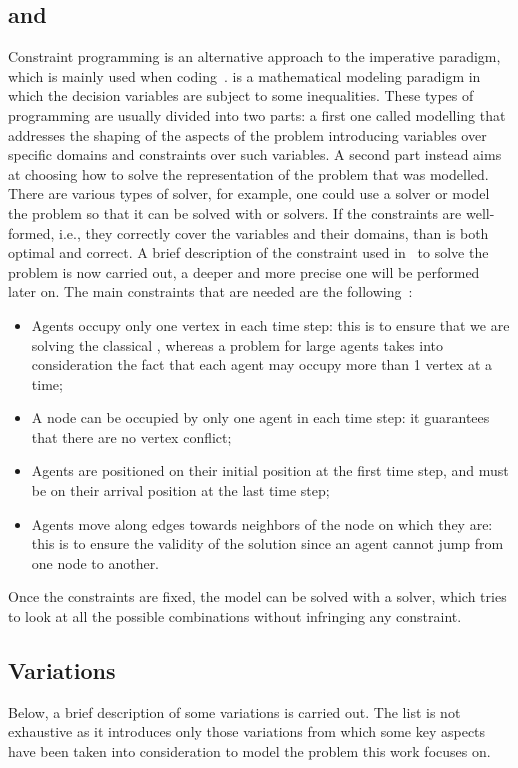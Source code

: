 \subsection{ and }
Constraint programming is an alternative approach to the imperative paradigm,
which is mainly used when coding~\cite{CP}.  is a mathematical
modeling paradigm in which the decision variables are subject to some
inequalities. These types of programming are usually divided into two parts: a
first one called modelling that addresses the shaping of the aspects of the
problem introducing variables over specific domains and constraints over such
variables. A second part instead aims at choosing how to solve the
representation of the problem that was modelled. There are various types of
solver, for example, one could use a  solver or model the problem so
that it can be solved with  or  solvers. \newline
If the constraints are well-formed, i.e., they correctly cover the variables
and their domains, than  is both optimal and correct. A brief
description of the constraint used in~\cite{picat1} to solve the 
problem is now carried out, a deeper and more precise one will be performed
later on. The main constraints that are needed are the
following~\cite{MAPF_overview}:
\begin{itemize}
  \item Agents occupy only one vertex in each time step: this is to ensure that
    we are solving the classical , whereas a  problem for
    large agents takes into consideration the fact that each agent may occupy
    more than 1 vertex at a time;
  \item A node can be occupied by only one agent in each time step: it
    guarantees that there are no vertex conflict;
  \item Agents are positioned on their initial position at the first time step,
    and must be on their arrival position at the last time step;
  \item Agents move along edges towards neighbors of the node on which they 
    are: this is to ensure the validity of the solution since an agent cannot
    jump from one node to another. 
\end{itemize}
Once the constraints are fixed, the model can be solved with a solver, which
tries to look at all the possible combinations without infringing any
constraint. 
%
%
\subsection{ Variations}
Below, a brief description of some  variations is carried out. The
list is not exhaustive as it introduces only those variations from which some
key aspects have been taken into consideration to model the problem this work
focuses on. 
%
